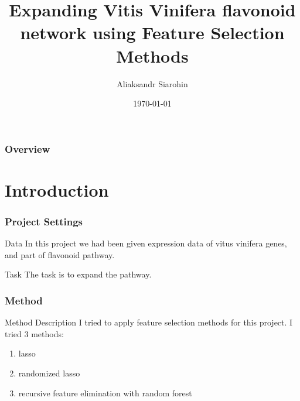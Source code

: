 \documentclass{beamer}
\title[Short title]{Expanding Vitis Vinifera flavonoid network using Feature Selection Methods} %
\author{Aliaksandr Siarohin} %
\institute[UCLA] %
{
University of Trento \\ %
\medskip
\textit{aliaksandr.siarohin@studenti.unitn.it} %
}
\date{\today} %
\begin{document}
\begin{frame}
\titlepage %
\end{frame}

\begin{frame}
\frametitle{Overview} %
\tableofcontents %
\end{frame}

                             

\section{Introduction} %
\begin{frame}
\frametitle{Project Settings}
\begin{block}{Data}
In this project we had been given expression data of vitus vinifera genes, and part of flavonoid pathway.
\end{block}
\begin{block}{Task}
The task is to expand the pathway.
\end{block}
\end{frame}

\begin{frame}
\frametitle{Method}
\begin{block}{Method Description}
I tried to apply feature selection methods for this project. I tried 3 methods:
\begin{enumerate}
\item lasso \cite{lasso}
\item randomized lasso \cite{randomized_lasso}
\item recursive feature elimination \cite{rfe} with random forest \cite{random_forest}
\end{enumerate}
\end{block}
\end{frame}
\end{document}
